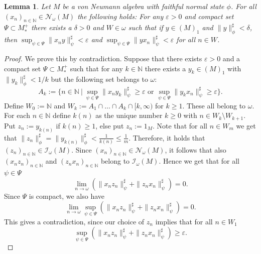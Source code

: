 \documentclass[11pt,a4paper]{article}
\newtheorem{lemma}[theorem]{Lemma}
\theoremstyle{definition}
\theoremstyle{remark}
\numberwithin{equation}{section}
\numberwithin{theorem}{section}
\newcommand{\N}{\mathbb{N}}
\newcommand{\e}{\varepsilon}
\begin{document}
\begin{lemma}\label{lemma:epsilon_delta_sequences}
Let $M$ be a von Neumann algebra with faithful normal state $\phi$. For all $(x_n)_{n \in \N} \in \mathcal{N}_\omega(M)$ the following holds: 
For any $\e >0$ and compact set $\Psi \subset M_*^+$ there exists a $\delta >0$ and $W \in \omega$ such that if $y \in (M)_1$ and $\|y\|_\phi^\sharp< \delta$, then $\sup_{\psi\in \Psi} \|x_n y\|_{\psi}^\sharp  <\e$ and $\sup_{\psi\in \Psi} \|y x_n\|_{\psi}^\sharp  <\e$ for all $n \in W$. 
\end{lemma}
\begin{proof} We prove this by contradiction. 
Suppose that there exists $\e >0$ and a compact set $\Psi \subset M_*^+$ such that for any $k \in \N$ there exists a $y_k \in (M)_1$ with $\|y_k\|_\phi^\sharp < 1/k$ but the following set belongs to $\omega$: 
\[
A_k := \Big\{ n \in\N \ \Big| \ \sup_{\psi \in \Psi}\|x_ny_k\|_\psi^\sharp\geq \e \text{ or } \sup_{\psi \in \Psi}\|y_k x_n\|_\psi^\sharp \geq \e \Big\}.
\]
Define $W_0 := \N$ and $W_k := A_1 \cap \hdots \cap A_k \cap [k, \infty)$ for $k \geq 1$. 
These all belong to $\omega$. 
For each $n \in \N$ define $k(n)$ as the unique number $k \geq 0$ with $n \in W_k \setminus W_{k+1}$. Put $z_n := y_{k(n)}$ if $k(n) \geq 1$, else put $z_n:=1_M$. 
Note that for all $n \in W_m$ we get that $\|z_n\|_\phi^\sharp = \|y_{k(n)}\|_\phi^\sharp <\frac{1}{k(n)} \leq \frac{1}{m}$. 
Therefore, it holds that $(z_n)_{n\in \N} \in \mathcal{I}_\omega(M)$. 
Since $(x_n)_{n \in \N} \in \mathcal{N}_\omega(M)$, it follows that also $(x_nz_n)_{n\in \N}$ and $(z_nx_n)_{n\in \N}$ belong to $\mathcal{I}_\omega(M)$. 
Hence we get that for all $\psi \in \Psi$ 
\[\lim_{n \rightarrow \omega} \left(\|x_nz_n\|_\psi^\sharp + \|z_nx_n\|_\psi^\sharp\right) = 0.\]
Since $\Psi$ is compact, we also have 
\[\lim_{n \rightarrow \omega} \sup_{\psi \in \Psi}\left(\|x_nz_n\|_\psi^\sharp + \|z_nx_n\|_\psi^\sharp\right) = 0.\]
This gives a contradiction, since our choice of $z_n$ implies that for all $n \in W_1$ 
\[\sup_{\psi \in \Psi}\left(\|x_nz_n\|_\psi^\sharp + \|z_nx_n\|_\psi^\sharp\right)\geq \e.\]
\end{proof}
\end{document}
